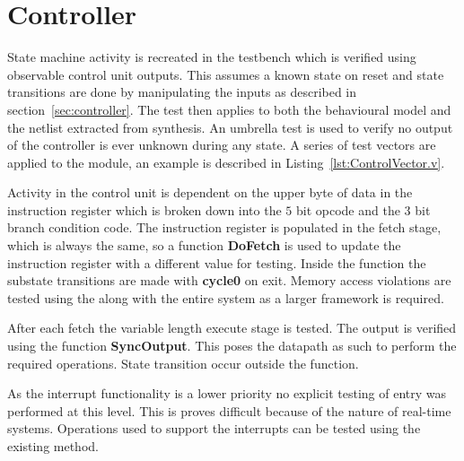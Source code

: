 
\section{Controller}

State machine activity is recreated in the testbench which is verified using observable control unit outputs.
This assumes a known state on reset and state transitions are done by manipulating the inputs as described in section~\ref{sec:controller}.  
The test then applies to both the behavioural model and the netlist extracted from synthesis.
An umbrella test is used to verify no output of the controller is ever unknown during any state.
A series of test vectors are applied to the module, an example is described in Listing~\ref{lst:ControlVector.v}.




Activity in the control unit is dependent on the upper byte of data in the instruction register which is broken down into the $5$ bit opcode and the $3$ bit branch condition code.  
The instruction register is populated in the fetch stage, which is always the same, so a function \textbf{DoFetch} is used to update the instruction register with a different value for testing.
Inside the function the substate transitions are made with \textbf{cycle0} on exit.
Memory access violations are tested using the along with the entire system as a larger framework is required.

After each fetch the variable length execute stage is tested.
The output is verified using the function \textbf{SyncOutput}. 
This poses the datapath as such to perform the required operations.
State transition occur outside the function.

As the interrupt functionality is a lower priority no explicit testing of entry was performed at this level.
This is proves difficult because of the nature of real-time systems.
Operations used to support the interrupts can be tested using the existing method. 
